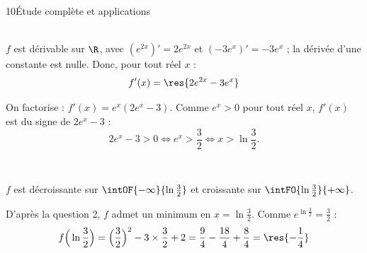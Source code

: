 \begin{corrige}{10}{Étude complète et applications}
\begin{questions}
  \item {}\\
    $f$ est dérivable sur $\R$, avec $(e^{2x})'=2e^{2x}$ et $(-3e^{x})'=-3e^{x}$ ; la dérivée d'une constante est nulle. Donc, pour tout réel $x$ :
    \[ f'(x)=\res{2e^{2x}-3e^{x}} \]
  \item On factorise : $f'(x)=e^{x}\left(2e^{x}-3\right)$. Comme $e^{x}>0$ pour tout réel $x$, $f'(x)$ est du signe de $2e^{x}-3$ :
    \[ 2e^{x}-3>0\iff e^{x}>\frac{3}{2}\iff x>\ln\frac{3}{2}. \]
    \begin{center}
      \begin{tableau}
      \end{tableau}\\[1mm]
    \end{center}
    $f$ est décroissante sur $\intOF{-\infty}{\ln\frac{3}{2}}$ et croissante sur $\intFO{\ln\frac{3}{2}}{+\infty}$.
  \item D'après la question 2, $f$ admet un minimum en $x=\ln\frac{3}{2}$. Comme $e^{\ln\frac{3}{2}}=\frac{3}{2}$ :
    \[ f\Big(\ln\frac{3}{2}\Big)=\Big(\frac{3}{2}\Big)^{2}-3\times\frac{3}{2}+2
       =\frac{9}{4}-\frac{18}{4}+\frac{8}{4}=\res{-\frac{1}{4}} \]
\end{questions}


\end{corrige}
